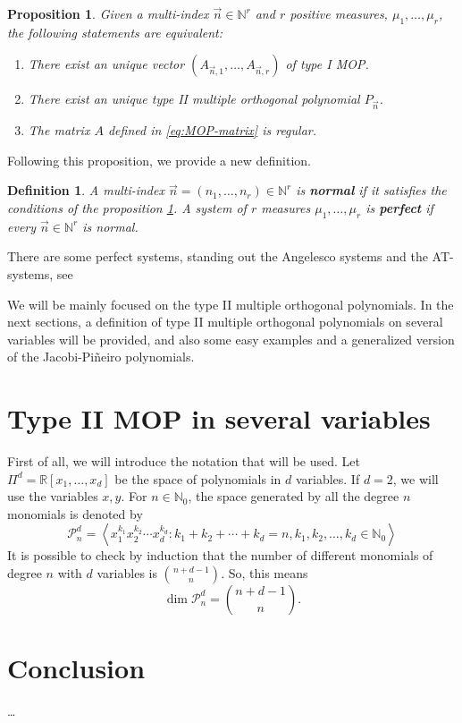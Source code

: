 \documentclass[12pt,a4]{article}
\theoremstyle{plain}
\newtheorem{proposition}[theorem]{Proposition}
\newtheorem{definition}[theorem]{Definition}
\newcommand{\R}[0]{\mathbb{R}}
\newcommand{\N}[0]{\mathbb{N}}
\begin{document}
\begin{proposition}
    \label{prop:existence-of-MOP}
    Given a multi-index $\vec n\in\N^r$ and $r$ positive measures, $\mu_1,\dots,\mu_r$, the following statements are equivalent:
    \begin{enumerate}
        \item There exist an unique vector $(A_{\vec n,1}, \dots, A_{\vec n,r})$ of type I MOP.
        \item There exist an unique type II multiple orthogonal polynomial $P_{\vec n}$.
        \item The matrix $A$ defined in \eqref{eq:MOP-matrix} is regular.
    \end{enumerate}
\end{proposition}

Following this proposition, we provide a new definition.

\begin{definition}
    A multi-index $\vec n = (n_1,\dots,n_r)\in\N^r$ is \textbf{normal} if it satisfies the conditions of the proposition \ref{prop:existence-of-MOP}.
    A system of $r$ measures $\mu_1,\dots,\mu_r$ is \textbf{perfect} if every $\vec n\in\N^r$ is normal.
\end{definition}

There are some perfect systems, standing out the Angelesco systems and the AT-systems, see \cite[Sections 23.1.1 and 23.1.2]{Ismail}

We will be mainly focused on the type II multiple orthogonal polynomials. In the next sections, a definition of type II multiple orthogonal polynomials on several variables will be provided, and also some easy examples and a generalized version of the Jacobi-Piñeiro polynomials. 

\section{Type II MOP in several variables}

First of all, we will introduce the notation that will be used. Let $\Pi^d=\R[x_1,\dots,x_d]$ be the space of polynomials in $d$ variables. If $d=2$, we will use the variables $x,y$. For $n\in\N_0$, the space generated by all the degree $n$ monomials is denoted by 
$$
\mathcal{P}_n^d = \left\langle x_1^{k_1} x_2^{k_2} \cdots x_d^{k_d}: k_1+k_2+\cdots +k_d = n, k_1,k_2,\dots,k_d\in\N_0\right\rangle
$$
It is possible to check by induction that the number of different monomials of degree $n$ with $d$ variables is $\displaystyle\binom{n+d-1}{n}$. So, this means
$$
\dim \mathcal{P}_n^d = \binom{n+d-1}{n}.
$$


\section{Conclusion}
\dots

\nocite{*}
{}

\end{document}
